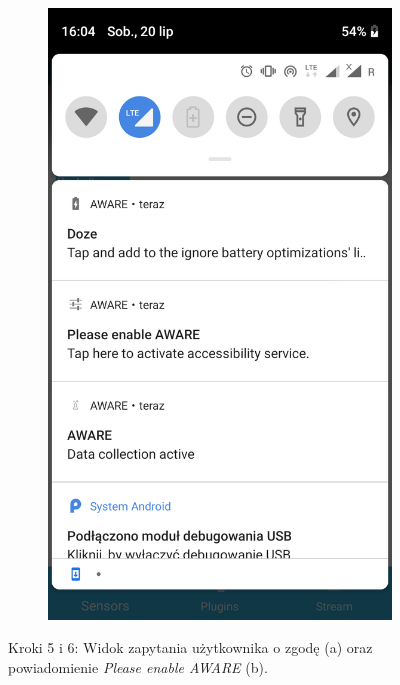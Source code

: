 \begin{enumerate}
\begin{figure}[H]
\begin{subfigure}{0.35\textwidth}
			\includegraphics[scale=0.13]{dodatekA/3_6.png}
			\subcaption{\label{subfigure_b}}
		\end{subfigure}
		\caption{ Kroki 5 i 6: Widok zapytania użytkownika o zgodę (a) oraz powiadomienie \textit{Please enable AWARE} (b).}
	\end{figure}
	\clearpage 
	

\end{enumerate}
